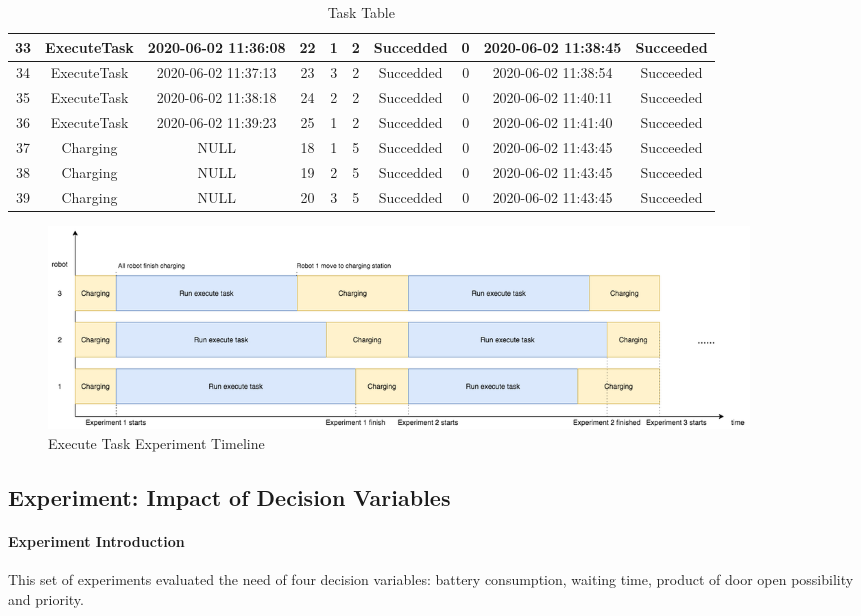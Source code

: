 \begin{table}[]
{\begin{tabular}{|c|c|c|c|c|c|c|c|c|c|}
33 & ExecuteTask & 2020-06-02 11:36:08 & 22 & 1 & 2 & Succedded & 0    & 2020-06-02 11:38:45 & Succeeded \\ \hline
34 & ExecuteTask & 2020-06-02 11:37:13 & 23 & 3 & 2 & Succedded & 0    & 2020-06-02 11:38:54 & Succeeded \\ \hline
35 & ExecuteTask & 2020-06-02 11:38:18 & 24 & 2 & 2 & Succedded & 0    & 2020-06-02 11:40:11 & Succeeded \\ \hline
36 & ExecuteTask & 2020-06-02 11:39:23 & 25 & 1 & 2 & Succedded & 0    & 2020-06-02 11:41:40 & Succeeded \\ \hline
37 & Charging    & NULL                & 18 & 1 & 5 & Succedded & 0 & 2020-06-02 11:43:45 & Succeeded \\ \hline
38 & Charging    & NULL                & 19 & 2 & 5 & Succedded & 0 & 2020-06-02 11:43:45 & Succeeded \\ \hline
39 & Charging    & NULL                & 20 & 3 & 5 & Succedded & 0 & 2020-06-02 11:43:45 & Succeeded \\ \hline
\end{tabular}}
\caption{Task Table}
\label{tab:exp_task_table}
\end{table}

\begin{figure}[htbp]
    \centering
    \includegraphics[width = 0.9\textwidth]{content/images/ch5/exe_exp_timeline.drawio.png}
    \caption{Execute Task Experiment Timeline}
    \label{fig:execute_task_experiment_timeline}
\end{figure}

\subsection{Experiment: Impact of Decision Variables}

\paragraph{Experiment Introduction} 
This set of experiments evaluated the need of four decision variables: battery consumption, waiting time, product of door open possibility and priority. 

